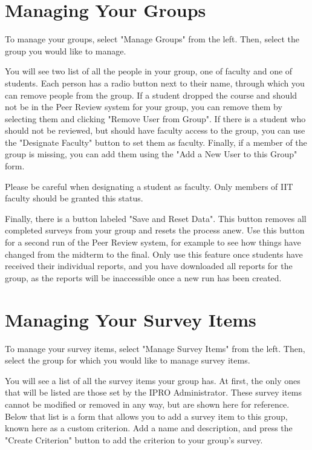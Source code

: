 \documentclass{article}
\begin{document}
\section{Managing Your Groups}

To manage your groups, select "Manage Groups" from the left. Then, select the group you would like to manage.

You will see two list of all the people in your group, one of faculty and one of students. Each person has a radio button next to their name, through which you can remove people from the group. If a student dropped the course and should not be in the Peer Review system for your group, you can remove them by selecting them and clicking "Remove User from Group". If there is a student who should not be reviewed, but should have faculty access to the group, you can use the "Designate Faculty" button to set them as faculty. Finally, if a member of the group is missing, you can add them using the "Add a New User to this Group" form.

Please be careful when designating a student as faculty. Only members of IIT faculty should be granted this status.

Finally, there is a button labeled "Save and Reset Data". This button removes all completed surveys from your group and resets the process anew. Use this button for a second run of the Peer Review system, for example to see how things have changed from the midterm to the final. Only use this feature once students have received their individual reports, and you have downloaded all reports for the group, as the reports will be inaccessible once a new run has been created.

\section{Managing Your Survey Items}

To manage your survey items, select "Manage Survey Items" from the left. Then, select the group for which you would like to manage survey items.

You will see a list of all the survey items your group has. At first, the only ones that will be listed are those set by the IPRO Administrator. These survey items cannot be modified or removed in any way, but are shown here for reference. Below that list is a form that allows you to add a survey item to this group, known here as a custom criterion. Add a name and description, and press the "Create Criterion" button to add the criterion to your group's survey.
\end{document}

